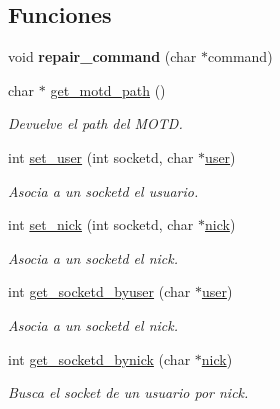 \subsection*{Funciones}
\begin{DoxyCompactItemize}
\item 
\hypertarget{G-2301-01-P1-irc__server_8c_a3b4f3d7a0636aace2e0a3a5cb567fac3}{}void {\bfseries repair\+\_\+command} (char $\ast$command)\label{G-2301-01-P1-irc__server_8c_a3b4f3d7a0636aace2e0a3a5cb567fac3}

\item 
char $\ast$ \hyperlink{G-2301-01-P1-irc__server_8c_a90d571ba3e74485d7abe3af70438aeab}{get\+\_\+motd\+\_\+path} ()
\begin{DoxyCompactList}\small\item\em Devuelve el path del M\+O\+T\+D. \end{DoxyCompactList}\item 
int \hyperlink{G-2301-01-P1-irc__server_8c_a71be0be6792712a1516302ce66227cb8}{set\+\_\+user} (int socketd, char $\ast$\hyperlink{G-2301-01-P1-irc_8c_a199bfa961df8d05a8aa4d9a0737a0c2b}{user})
\begin{DoxyCompactList}\small\item\em Asocia a un socketd el usuario. \end{DoxyCompactList}\item 
int \hyperlink{G-2301-01-P1-irc__server_8c_a19f08dad4bf96965302e73d10b15011f}{set\+\_\+nick} (int socketd, char $\ast$\hyperlink{G-2301-01-P1-irc_8c_ab60b803c6ebb88356d689183be9d2e34}{nick})
\begin{DoxyCompactList}\small\item\em Asocia a un socketd el nick. \end{DoxyCompactList}\item 
int \hyperlink{G-2301-01-P1-irc__server_8c_aa5f9477e9a1ddd8f86558b161eaa8b46}{get\+\_\+socketd\+\_\+byuser} (char $\ast$\hyperlink{G-2301-01-P1-irc_8c_a199bfa961df8d05a8aa4d9a0737a0c2b}{user})
\begin{DoxyCompactList}\small\item\em Asocia a un socketd el nick. \end{DoxyCompactList}\item 
int \hyperlink{G-2301-01-P1-irc__server_8c_a52b8b3170ab4c384312ddb1c71678008}{get\+\_\+socketd\+\_\+bynick} (char $\ast$\hyperlink{G-2301-01-P1-irc_8c_ab60b803c6ebb88356d689183be9d2e34}{nick})
\begin{DoxyCompactList}\small\item\em Busca el socket de un usuario por nick. \end{DoxyCompactList}\item 

\end{DoxyCompactItemize}
